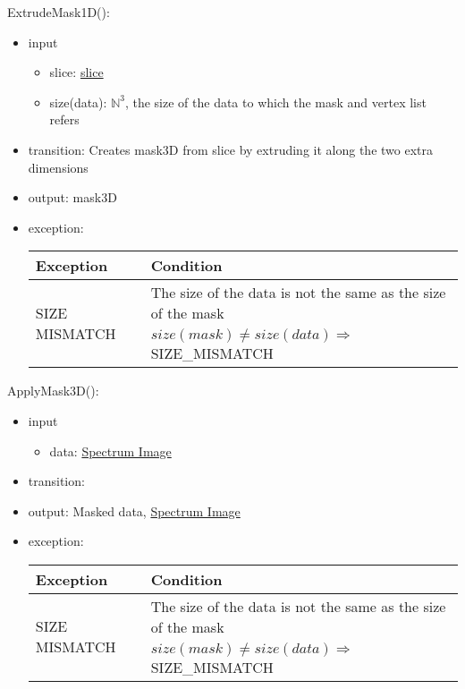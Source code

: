 \documentclass[12pt, titlepage]{article}
\begin{document}
\noindent ExtrudeMask1D():
\begin{itemize}
    \item input
    \begin{itemize}
        \item slice: \hyperref[Mod:Slice1D]{slice}
        \item size(data): $\mathbb{N}^3$, the size of the data to which the mask
        and vertex list refers
    \end{itemize}
    \item transition: Creates mask3D from slice by extruding it along the two
    extra dimensions
    \item output: mask3D
    \item exception:
    \begin{center}
        \begin{tabular}{p{3.5cm} p{12cm}}
            \toprule[0.15em]
            \textbf{Exception} & \textbf{Condition}\\
            \midrule[0.1em]
            \multirow{2}{0.25\textwidth}{SIZE MISMATCH} & The size of the data
            is not the same as the size of the mask\\ 
            & $size(mask) \neq size(data) \Rightarrow$ SIZE\_MISMATCH\\ 
            \bottomrule[0.15em]
        \end{tabular}
    \end{center}
\end{itemize}

\noindent ApplyMask3D():
\begin{itemize}
    \item input
    \begin{itemize}
        \item data: \hyperref[Mod:SI]{Spectrum Image}
    \end{itemize}
    \item transition: 
    \item output: Masked data, \hyperref[Mod:SI]{Spectrum Image}
    \item exception:
    \begin{center}
        \begin{tabular}{p{3.5cm} p{12cm}}
            \toprule[0.15em]
            \textbf{Exception} & \textbf{Condition}\\
            \midrule[0.1em]
            \multirow{2}{0.25\textwidth}{SIZE MISMATCH} & The size of the data
            is not the same as the size of the mask\\ 
            & $size(mask) \neq size(data) \Rightarrow$ SIZE\_MISMATCH\\ 
            \bottomrule[0.15em]
        \end{tabular}
    \end{center}
\end{itemize}
\end{document}

